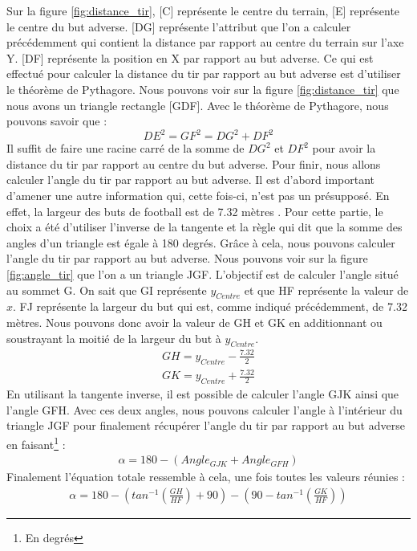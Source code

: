 \documentclass[12pt]{article}
\begin{document}
Sur la figure \ref{fig:distance_tir}, [C] représente le centre du terrain, [E] représente le centre du but adverse.
[DG] représente l'attribut que l'on a calculer précédemment qui contient la distance par rapport au centre du terrain sur l'axe Y.
[DF] représente la position en X par rapport au but adverse.
Ce qui est effectué pour calculer la distance du tir par rapport au but adverse est d'utiliser le théorème de Pythagore.
Nous pouvons voir sur la figure \ref{fig:distance_tir} que nous avons un triangle rectangle [GDF].
Avec le théorème de Pythagore, nous pouvons savoir que :
\begin{equation}
    DE^2 = GF^2 = DG^2 + DF^2
\end{equation}
Il suffit de faire une racine carré de la somme de $DG^2$ et $DF^2$ pour avoir la distance du tir par rapport au centre du but adverse.
\newline\newline
Pour finir, nous allons calculer l'angle du tir par rapport au but adverse.
Il est d'abord important d'amener une autre information qui, cette fois-ci, n'est pas un présupposé.
En effet, la largeur des buts de football est de 7.32 mètres \cite{TerrainIFAB}.
Pour cette partie, le choix a été d'utiliser l'inverse de la tangente et la règle qui dit que la somme des angles d'un triangle est égale à 180 degrés.
Grâce à cela, nous pouvons calculer l'angle du tir par rapport au but adverse.
Nous pouvons voir sur la figure \ref{fig:angle_tir} que l'on a un triangle JGF.
L'objectif est de calculer l'angle situé au sommet G.
On sait que GI représente $y_{Centre}$ et que HF représente la valeur de $x$.
FJ représente la largeur du but qui est, comme indiqué précédemment, de 7.32 mètres.
Nous pouvons donc avoir la valeur de GH et GK en additionnant ou soustrayant la moitié de la largeur du but à $y_{Centre}$.
\begin{equation}
    \begin{split}
        GH = y_{Centre} - \frac{7.32}{2} \\
        GK = y_{Centre} + \frac{7.32}{2}
    \end{split}
\end{equation}
En utilisant la tangente inverse, il est possible de calculer l'angle GJK ainsi que l'angle GFH.
Avec ces deux angles, nous pouvons calculer l'angle à l'intérieur du triangle JGF pour finalement récupérer l'angle du tir par rapport au but adverse en faisant\footnote{En degrés} :
\begin{equation}
    \begin{split}
        \alpha = 180 - (Angle_{GJK} + Angle_{GFH})
    \end{split}
\end{equation}
Finalement l'équation totale ressemble à cela, une fois toutes les valeurs réunies :
\begin{equation}
    \begin{split}
        \alpha = 180 - (tan^{-1}(\frac{GH}{HF}) + 90) - (90 -tan^{-1}(\frac{GK}{HF}))
    \end{split}
\end{equation}
\end{document}
